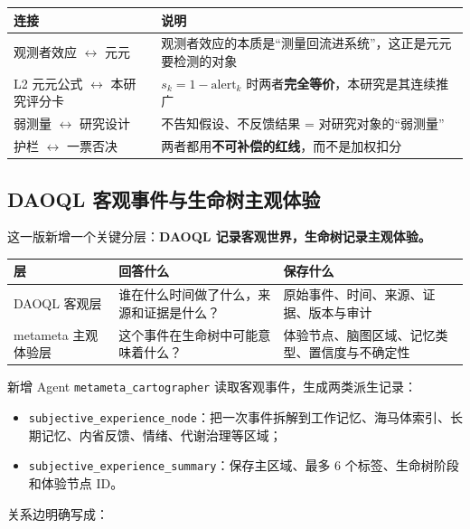 \documentclass[UTF8,a4paper,11pt]{ctexart}
\begin{document}
\begin{center}
\begin{tabular}{p{5.0cm}p{8.2cm}}
\toprule
\textbf{连接} & \textbf{说明} \\
\midrule
观测者效应 $\leftrightarrow$ 元元 &
观测者效应的本质是“测量回流进系统”，这正是元元要检测的对象 \\
L2 元元公式 $\leftrightarrow$ 本研究评分卡 &
$s_k = 1-\text{alert}_k$ 时两者\textbf{完全等价}，本研究是其连续推广 \\
弱测量 $\leftrightarrow$ 研究设计 &
不告知假设、不反馈结果 = 对研究对象的“弱测量” \\
护栏 $\leftrightarrow$ 一票否决 &
两者都用\textbf{不可补偿的红线}，而不是加权扣分 \\
\bottomrule
\end{tabular}
\end{center}


\subsection{DAOQL 客观事件与生命树主观体验}

这一版新增一个关键分层：\textbf{DAOQL 记录客观世界，生命树记录主观体验。}

\begin{center}
\begin{longtable}{@{}p{3.2cm}p{5.0cm}p{5.6cm}@{}}
\toprule
\textbf{层} & \textbf{回答什么} & \textbf{保存什么} \\
\midrule
DAOQL 客观层 & 谁在什么时间做了什么，来源和证据是什么？ & 原始事件、时间、来源、证据、版本与审计 \\
metameta 主观体验层 & 这个事件在生命树中可能意味着什么？ & 体验节点、脑图区域、记忆类型、置信度与不确定性 \\
\bottomrule
\end{longtable}
\end{center}

新增 Agent \texttt{metameta\_cartographer} 读取客观事件，生成两类派生记录：

\begin{itemize}[leftmargin=2em]
\item \texttt{subjective\_experience\_node}：把一次事件拆解到工作记忆、海马体索引、长期记忆、内省反馈、情绪、代谢治理等区域；
\item \texttt{subjective\_experience\_summary}：保存主区域、最多 6 个标签、生命树阶段和体验节点 ID。
\end{itemize}

关系边明确写成：
\end{document}
